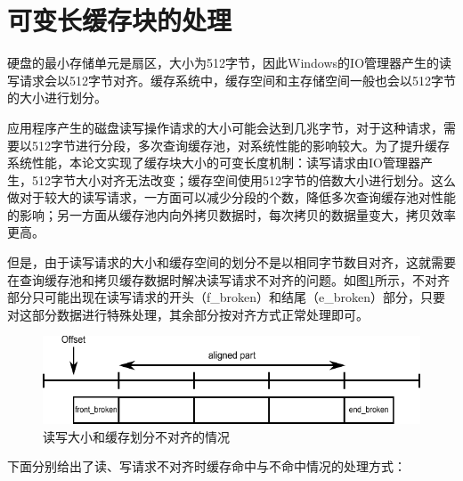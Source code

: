 
\section{可变长缓存块的处理}

硬盘的最小存储单元是扇区，大小为512字节，因此Windows的IO管理器产生的读写请求会以512字节对齐。缓存系统中，缓存空间和主存储空间一般也会以512字节的大小进行划分。

应用程序产生的磁盘读写操作请求的大小可能会达到几兆字节，对于这种请求，需要以512字节进行分段，多次查询缓存池，对系统性能的影响较大。为了提升缓存系统性能，本论文实现了缓存块大小的可变长度机制：读写请求由IO管理器产生，512字节大小对齐无法改变；缓存空间使用512字节的倍数大小进行划分。这么做对于较大的读写请求，一方面可以减少分段的个数，降低多次查询缓存池对性能的影响；另一方面从缓存池内向外拷贝数据时，每次拷贝的数据量变大，拷贝效率更高。

但是，由于读写请求的大小和缓存空间的划分不是以相同字节数目对齐，这就需要在查询缓存池和拷贝缓存数据时解决读写请求不对齐的问题。如图\ref{fig:vsize-cache-block}所示，不对齐部分只可能出现在读写请求的开头（f\_broken）和结尾（e\_broken）部分，只要对这部分数据进行特殊处理，其余部分按对齐方式正常处理即可。

\begin{figure}[H]
\centering
\includegraphics[width=0.75\linewidth]{./graph/vsize-cache-block}
\caption{读写大小和缓存划分不对齐的情况}
\label{fig:vsize-cache-block}
\end{figure}

下面分别给出了读、写请求不对齐时缓存命中与不命中情况的处理方式：

